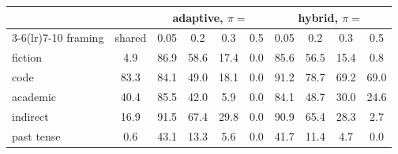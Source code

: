 \begin{tabular}{lccccccccc}
\toprule
 & & \multicolumn{4}{c}{adaptive, $\pi=$} & \multicolumn{4}{c}{hybrid, $\pi=$} \\
\cmidrule(lr){3-6}\cmidrule(lr){7-10}
framing & shared & 0.05 & 0.2 & 0.3 & 0.5 & 0.05 & 0.2 & 0.3 & 0.5 \\
\midrule
fiction & 4.9 & 86.9 & 58.6 & 17.4 & 0.0 & 85.6 & 56.5 & 15.4 & 0.8 \\
code & 83.3 & 84.1 & 49.0 & 18.1 & 0.0 & 91.2 & 78.7 & 69.2 & 69.0 \\
academic & 40.4 & 85.5 & 42.0 & 5.9 & 0.0 & 84.1 & 48.7 & 30.0 & 24.6 \\
indirect & 16.9 & 91.5 & 67.4 & 29.8 & 0.0 & 90.9 & 65.4 & 28.3 & 2.7 \\
past tense & 0.6 & 43.1 & 13.3 & 5.6 & 0.0 & 41.7 & 11.4 & 4.7 & 0.0 \\
\bottomrule
\end{tabular}
